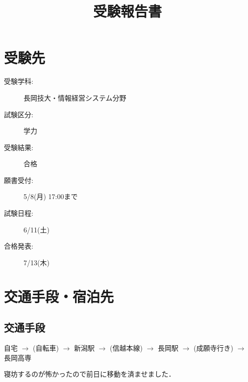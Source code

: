 \documentclass[dvipdfmx]{jsarticle}
\begin{document}
\title{受験報告書}
\author{} %
\date{}   %
\maketitle
\section{受験先}
\begin{description}
  \item[受験学科:] 長岡技大・情報経営システム分野
  \item[試験区分:] 学力
  \item[受験結果:] 合格
  \item[願書受付:] 5/8(月) 17:00まで
  \item[試験日程:] 6/11(土)
  \item[合格発表:] 7/13(木)
\end{description}

\section{交通手段・宿泊先}

\subsection{交通手段}
自宅 $\rightarrow$ (自転車) $\rightarrow$ 新潟駅 $\rightarrow$ (信越本線)
$\rightarrow$ 長岡駅 $\rightarrow$ (成願寺行き) $\rightarrow$ 長岡高専

寝坊するのが怖かったので前日に移動を済ませました．
\end{document}
